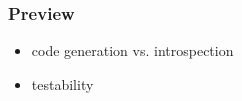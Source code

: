 \begin{frame}
	\frametitle{Preview}
	\begin{itemize}
	\item code generation vs. introspection
	\item testability
	\end{itemize}
\end{frame}



\nocite{raab2016improving}

\appendix

\begin{frame}[allowframebreaks]
	
	
\end{frame}




